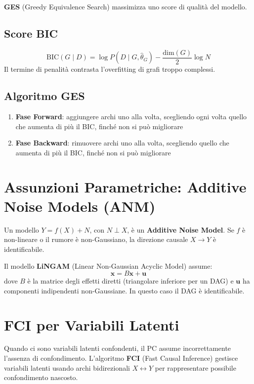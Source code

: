 \textbf{GES} (Greedy Equivalence Search) massimizza uno score di qualità del modello.

\subsection{Score BIC}
\[
\text{BIC}(G \mid D) = \log P(D \mid G, \hat{\theta}_G) - \frac{\text{dim}(G)}{2}\log N
\]
Il termine di penalità contrasta l'overfitting di grafi troppo complessi.

\subsection{Algoritmo GES}
\begin{enumerate}
    \item \textbf{Fase Forward}: aggiungere archi uno alla volta, scegliendo ogni volta quello che aumenta di più il BIC, finché non si può migliorare
    \item \textbf{Fase Backward}: rimuovere archi uno alla volta, scegliendo quello che aumenta di più il BIC, finché non si può migliorare
\end{enumerate}

\section{Assunzioni Parametriche: Additive Noise Models (ANM)}

\begin{definition}
Un modello $Y = f(X) + N$, con $N \perp X$, è un \textbf{Additive Noise Model}. Se $f$ è non-lineare o il rumore è non-Gaussiano, la direzione causale $X \to Y$ è identificabile.
\end{definition}

Il modello \textbf{LiNGAM} (Linear Non-Gaussian Acyclic Model) assume:
\[\mathbf{x} = B\mathbf{x} + \mathbf{u}\]
dove $B$ è la matrice degli effetti diretti (triangolare inferiore per un DAG) e $\mathbf{u}$ ha componenti indipendenti non-Gaussiane. In questo caso il DAG è identificabile.

\section{FCI per Variabili Latenti}

Quando ci sono variabili latenti confondenti, il PC assume incorrettamente l'assenza di confondimento. L'algoritmo \textbf{FCI} (Fast Causal Inference) gestisce variabili latenti usando archi bidirezionali $X \leftrightarrow Y$ per rappresentare possibile confondimento nascosto.

